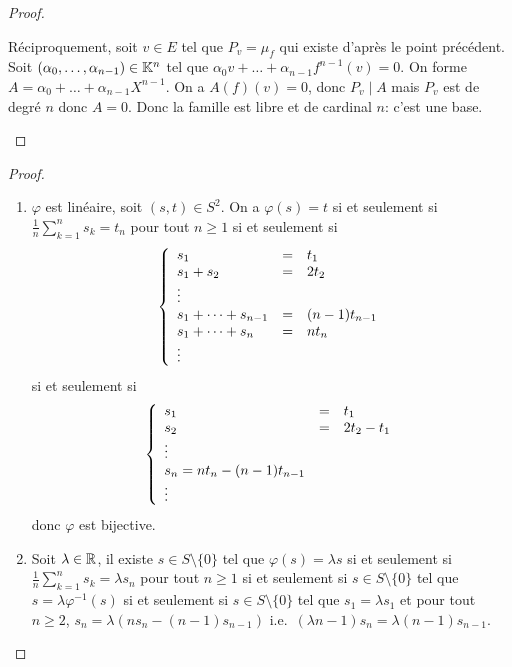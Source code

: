 \documentclass[12pt]{article}
\begin{document}
\begin{proof}
\begin{enumerate}
		Réciproquement, soit $v\in E$ tel que $P_{v}=\mu_{f}$ qui existe d'après le point précédent. Soit $(\alpha_{0},\dots,\alpha_{n-1})\in\mathbb{K}^{n}$ tel que $\alpha_{0}v+\dots+\alpha_{n-1}f^{n-1}(v)=0$. On forme $A=\alpha_{0}+\dots+\alpha_{n-1}X^{n-1}$. On a $A(f)(v)=0$, donc $P_{v}\mid A$ mais $P_{v}$ est de degré $n$ donc $A=0$. Donc la famille est libre et de cardinal $n$: c'est une base.
	\end{enumerate}
\end{proof}

\begin{proof}
	\phantom{}
	\begin{enumerate}
		\item $\varphi$ est linéaire, soit $(s,t)\in S^{2}$. On a $\varphi(s)=t$ si et seulement si $\frac{1}{n}\sum_{k=1}^{n}s_{k}=t_{n}$ pour tout $n\geqslant1$ si et seulement si 
		\begin{equation}
			\left\lbrace
				\begin{array}[]{lll}
					s_{1}&=&t_{1}\\
					s_{1}+s_{2}&=&2t_{2}\\
					\vdots\\
					s_{1}+\dots+s_{n-1}&=&(n-1)t_{n-1}\\
					s_{1}+\dots+s_{n}&=&nt_{n}\\
					\vdots
				\end{array}
			\right.
		\end{equation}
		si et seulement si 
		\begin{equation}
			\left\lbrace
				\begin{array}[]{lll}
					s_{1}&=&t_{1}\\
					s_{2}&=&2t_{2}-t_{1}\\
					\vdots\\
					s_{n}=nt_{n}-(n-1)t_{n-1}\\
					\vdots
				\end{array}
			\right.
		\end{equation}
		donc $\varphi$ est bijective.

		\item Soit $\lambda\in\mathbb{R}$, il existe $s\in S\setminus\lbrace0\rbrace$ tel que $\varphi(s)=\lambda s$ si et seulement si $\frac{1}{n}\sum_{k=1}^{n}s_{k}=\lambda s_{n}$ pour tout $n\geqslant1$ si et seulement si $s\in S\setminus\lbrace0\rbrace$ tel que $s=\lambda\varphi^{-1}(s)$ si et seulement si $s\in S\setminus\lbrace0\rbrace$ tel que $s_{1}=\lambda s_{1}$ et pour tout $n\geqslant2$, $s_{n}=\lambda(ns_{n}-(n-1)s_{n-1})$ i.e.~$(\lambda n-1)s_{n}=\lambda(n-1)s_{n-1}$.
		

\end{enumerate}
\end{proof}
\end{document}
